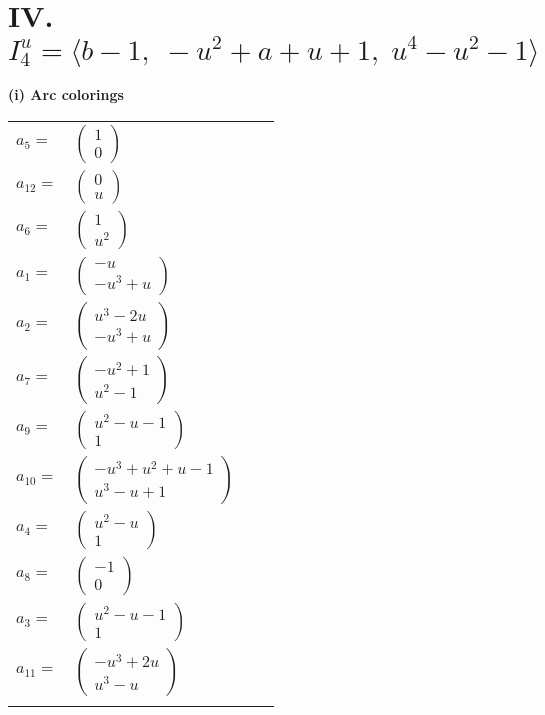 \documentclass[1p]{elsarticle_modified}
\theoremstyle{definition}
\begin{document}
\centering \section*{IV. $I^u_{4}= \langle b-1,\;- u^2+a+u+1,\;u^4- u^2-1 \rangle$}
\flushleft \textbf{(i) Arc colorings}\\
\begin{tabular}{m{7pt} m{180pt} m{7pt} m{180pt} }
\flushright $a_{5}=$&$\begin{pmatrix}1\\0\end{pmatrix}$ \\
\flushright $a_{12}=$&$\begin{pmatrix}0\\u\end{pmatrix}$ \\
\flushright $a_{6}=$&$\begin{pmatrix}1\\u^2\end{pmatrix}$ \\
\flushright $a_{1}=$&$\begin{pmatrix}- u\\- u^3+u\end{pmatrix}$ \\
\flushright $a_{2}=$&$\begin{pmatrix}u^3-2 u\\- u^3+u\end{pmatrix}$ \\
\flushright $a_{7}=$&$\begin{pmatrix}- u^2+1\\u^2-1\end{pmatrix}$ \\
\flushright $a_{9}=$&$\begin{pmatrix}u^2- u-1\\1\end{pmatrix}$ \\
\flushright $a_{10}=$&$\begin{pmatrix}- u^3+u^2+u-1\\u^3- u+1\end{pmatrix}$ \\
\flushright $a_{4}=$&$\begin{pmatrix}u^2- u\\1\end{pmatrix}$ \\
\flushright $a_{8}=$&$\begin{pmatrix}-1\\0\end{pmatrix}$ \\
\flushright $a_{3}=$&$\begin{pmatrix}u^2- u-1\\1\end{pmatrix}$ \\
\flushright $a_{11}=$&$\begin{pmatrix}- u^3+2 u\\u^3- u\end{pmatrix}$\\&\end{tabular}
\end{document}
